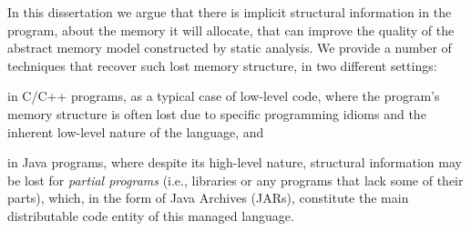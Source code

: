 In this dissertation we argue that there is implicit structural
information in the program, about the memory it will allocate, that
can improve the quality of the abstract memory model constructed by
static analysis. We provide a number of techniques that recover such
lost memory structure, in two different settings:%
\begin{inparaenum}[(1)]
\item in C/C++ programs, as a typical case of low-level code, where
  the program's memory structure is often lost due to specific
  programming idioms and the inherent low-level nature of the
  language, and
\item in Java programs, where despite its high-level nature,
  structural information may be lost for \emph{partial programs}
  (i.e., libraries or any programs that lack some of their parts),
  which, in the form of Java Archives (JARs), constitute the main
  distributable code entity of this managed language.
\end{inparaenum}


